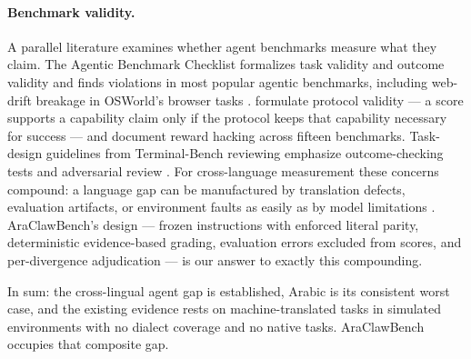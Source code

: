 \paragraph{Benchmark validity.}
A parallel literature examines whether agent benchmarks measure what they
claim. The Agentic Benchmark Checklist formalizes task validity and outcome
validity and finds violations in most popular agentic benchmarks, including
web-drift breakage in OSWorld's browser tasks \citep{zhu2025abc}.
\citet{shao2026protocolvalidity} formulate protocol validity --- a score
supports a capability claim only if the protocol keeps that capability
necessary for success --- and document reward hacking across fifteen
benchmarks. Task-design guidelines from Terminal-Bench reviewing emphasize
outcome-checking tests and adversarial review \citep{bercovich2026guidelines}.
For cross-language measurement these concerns compound: a language gap can be
manufactured by translation defects, evaluation artifacts, or environment
faults as easily as by model limitations \citep{kim2026lilt,
caciolai2026omnilingual}. AraClawBench's design --- frozen instructions with
enforced literal parity, deterministic evidence-based grading, evaluation
errors excluded from scores, and per-divergence adjudication --- is our answer
to exactly this compounding.

\medskip
\noindent In sum: the cross-lingual agent gap is established, Arabic is its
consistent worst case, and the existing evidence rests on machine-translated
tasks in simulated environments with no dialect coverage and no native tasks.
AraClawBench occupies that composite gap.
